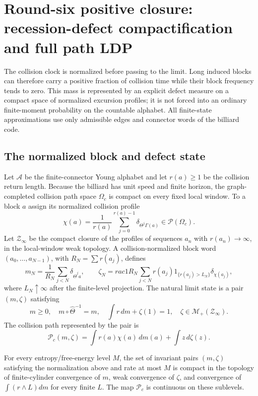 \section{Round-six positive closure: recession-defect compactification and full path LDP}
\label{sec:r6-a3}

The collision clock is normalized before passing to the limit.  Long induced
blocks can therefore carry a positive fraction of collision time while their
block frequency tends to zero.  This mass is represented by an explicit
defect measure on a compact space of normalized excursion profiles; it is not
forced into an ordinary finite-moment probability on the countable alphabet.
All finite-state approximations use only admissible edges and connector words
of the billiard code.

\subsection{The normalized block and defect state}

Let \(\mathcal A\) be the finite-connector Young alphabet and let
\(r(a)\ge1\) be the collision return length.  Because the billiard has unit
speed and finite horizon, the graph-completed collision path space
\(\Omega_c\) is compact on every fixed local window.  To a block \(a\) assign
its normalized collision profile
\[
\chi(a)=\frac1{r(a)}\sum_{j=0}^{r(a)-1}
\delta_{\Theta^j\Gamma(a)}\in\mathcal P(\Omega_c).
\]
Let \(\mathcal Z_\infty\) be the compact closure of the profiles of sequences
\(a_n\) with \(r(a_n)\to\infty\), in the local-window weak topology.  A
collision-normalized block word \((a_0,\ldots,a_{N-1})\), with
\(R_N=\sum r(a_j)\), defines
\[
m_N=\frac1{R_N}\sum_{j<N}\delta_{\widehat\Theta^ja},
\qquad
\zeta_N=rac1{R_N}
\sum_{j<N}r(a_j)1_{\{r(a_j)>L_N\}}\delta_{\chi(a_j)},
\]
where \(L_N\uparrow\infty\) after the finite-level projection.  The natural
limit state is a pair \((m,\zeta)\) satisfying
\[
 m\ge0,\quad m\circ\widehat\Theta^{-1}=m,\quad
 \int r\,dm+\zeta(1)=1,\quad
 \zeta\in\mathcal M_+(\mathcal Z_\infty).
\]
The collision path represented by the pair is
\[
\mathscr P_c(m,\zeta)
=\int r(a)\chi(a)\,dm(a)+\int z\,d\zeta(z).
\]

\begin{lemma}
\label{lem:r6-a3-compact}
For every entropy/free-energy level \(M\), the set of invariant pairs
\((m,\zeta)\) satisfying the normalization above and rate at most \(M\) is
compact in the topology of finite-cylinder convergence of \(m\), weak
convergence of \(\zeta\), and convergence of \(\int(r\wedge L)dm\) for every
finite \(L\).  The map \(\mathscr P_c\) is continuous on these sublevels.
\end{lemma}

